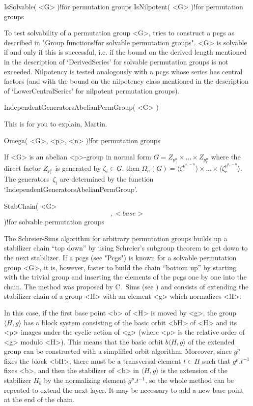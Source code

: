 \>IsSolvable( <G> )!{for permutation groups}
\>IsNilpotent( <G> )!{for permutation groups}

To test solvability of a permutation group <G>, {\GAP} tries to construct
a pcgs as described in "Group functions!for solvable permutation groups".
<G> is solvable if and  only if this is  successful, i.e. if the bound on
the  derived length mentioned in the   description of `DerivedSeries' for
solvable   permutation groups is    not  exceeded. Nilpotency is   tested
analogously with  a pcgs whose series has  central factors (and  with the
bound   on  the   nilpotency  class  mentioned  in    the description  of
`LowerCentralSeries' for nilpotent permutation groups).

\>IndependentGeneratorsAbelianPermGroup( <G> )

This is for you to explain, Martin.

\>Omega( <G>, <p>, <n> )!{for permutation groups}

If <G> is an abelian <p>-group in normal  form $G=Z_{p^n_1} \times \ldots
\times  Z_{p^n_r}$ where  the  direct factor $Z_{p^n_i}$  is generated by
$\zeta_i\in  G$, then $\Omega_n(G)  = \langle  \zeta_1^{p^{n_1-n}}\rangle
\times \ldots    \times      \langle\zeta_r^{p^{n_r-n}}\rangle$.      The
generators~$\zeta_i$    are     determined           by  the     function
`IndependentGeneratorsAbelianPermGroup'.


\>StabChain( <G> \[, <base> \] )!{for solvable permutation groups}

The Schreier-Sims algorithm for  arbitrary permutation groups builds up a
stabilizer chain ``top down'' by using Schreier's subgroup theorem to get
down to the next stabilizer.   If a pcgs  (see  "Pcgs")  is known for   a
solvable permutation group <G>, it is, however, faster to build the chain
``bottom  up'' by starting  with  the  trivial  group and inserting   the
elements of the pcgs one by  one into the chain.  The method was proposed
by C.~Sims (see \cite{Sims90b}) and  consists of extending the stabilizer
chain of a group <H> with an element <g> which normalizes <H>.

\danger In this case, if the first base point <b> of <H> is moved by <g>,
the group $\langle H,g\rangle$ has a block system consisting of the basic
orbit <bH>   of <H> and  its <p>  images under the  cyclic action  of <g>
(where <p> is the relative order of <g> modulo <H>).  This means that the
basic orbit  $b\langle    H,g\rangle$  of the  extended     group can  be
constructed with a   simplified  orbit algorithm.  Moreover,  since $g^p$
fixes the block <bH>,  there must be a transversal  element $t\in H$ such
that $g^p.t^{-1}$ fixes <b>, and  then the stabilizer  of <b> in $\langle
H,g\rangle$  is the extension of the  stabilizer $H_b$ by the normalizing
element $g^p.t^{-1}$, so  the whole method  can be repeated to extend the
next layer. It may be necessary to add a new base point at the end of the
chain.

